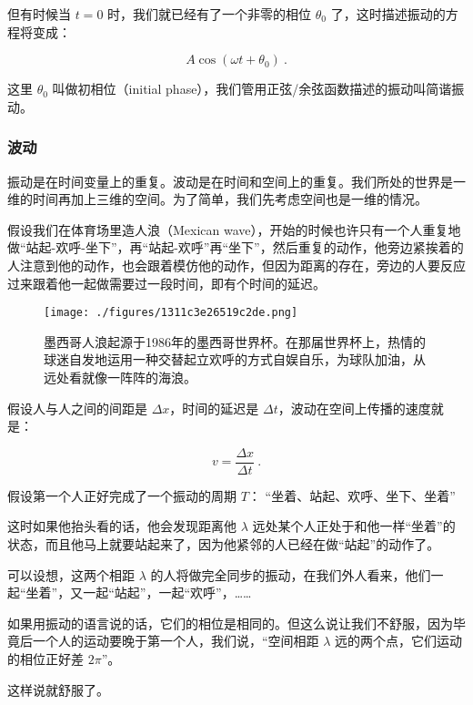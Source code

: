 但有时候当 $t = 0$ 时，我们就已经有了一个非零的相位 $\theta_0$ 了，这时描述振动的方程将变成：

\begin{equation}
A \cos (\omega t + \theta_0)~.
\end{equation}

这里 $\theta_0$ 叫做初相位（initial phase），我们管用正弦/余弦函数描述的振动叫简谐振动。


\subsubsection{波动}

振动是在时间变量上的重复。波动是在时间和空间上的重复。我们所处的世界是一维的时间再加上三维的空间。为了简单，我们先考虑空间也是一维的情况。

假设我们在体育场里造人浪（Mexican wave），开始的时候也许只有一个人重复地做“站起-欢呼-坐下”，再“站起-欢呼”再“坐下”，然后重复的动作，他旁边紧挨着的人注意到他的动作，也会跟着模仿他的动作，但因为距离的存在，旁边的人要反应过来跟着他一起做需要过一段时间，即有个时间的延迟。

\begin{figure}[ht]
\centering
\texttt{[image: ./figures/1311c3e26519c2de.png]}
\caption{墨西哥人浪起源于1986年的墨西哥世界杯。在那届世界杯上，热情的球迷自发地运用一种交替起立欢呼的方式自娱自乐，为球队加油，从远处看就像一阵阵的海浪。} \label{fig_AtomId_8}
\end{figure}


假设人与人之间的间距是 $\Delta x$，时间的延迟是 $\Delta t$，波动在空间上传播的速度就是：

\begin{equation}
v = \frac{\Delta x }{\Delta t}~.
\end{equation}

假设第一个人正好完成了一个振动的周期 $T$： “坐着、站起、欢呼、坐下、坐着”

这时如果他抬头看的话，他会发现距离他 $\lambda$ 远处某个人正处于和他一样“坐着”的状态，而且他马上就要站起来了，因为他紧邻的人已经在做“站起”的动作了。

可以设想，这两个相距 $\lambda$ 的人将做完全同步的振动，在我们外人看来，他们一起“坐着”，又一起“站起”，一起“欢呼”，……

如果用振动的语言说的话，它们的相位是相同的。但这么说让我们不舒服，因为毕竟后一个人的运动要晚于第一个人，我们说，“空间相距 $\lambda$ 远的两个点，它们运动的相位正好差 $2 \pi$”。


这样说就舒服了。


